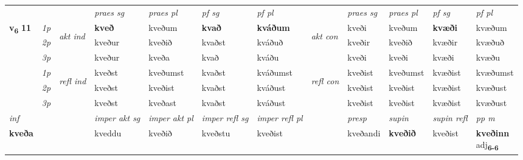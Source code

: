 \begin{longtable}[l]{X>{\footnotesize\itshape}llXXXXlXXXX}
 & &   & \textit{praes sg}  & \textit{praes pl}    & \textit{ pf sg} & \textit{pf pl} & & \textit{praes sg}  & \textit{praes pl}    & \textit{pf sg} & \textit{pf pl }  \\ \cmidrule{4-7} \cmidrule{9-12}
 \multirow{2}{*}{{{\textbf{v{\textsubscript{6}}} \Large{\textbf{11}}}}}  & 1p & \multirow{3}{*}{\begin{turn}{90}\textit{akt ind}\end{turn}} & \textbf{kveð} & kveðum & \textbf{kvað} & \textbf{kváðum} & \multirow{3}{*}{\begin{turn}{90}\textit{akt con}\end{turn}} &kveði & kveðum & \textbf{kvæði} & kvæðum\\*
 & 2p &  &  kveður  & kveðið & kvaðst & kváðuð & & kveðir & kveðið & kvæðir & kvæðuð \\*
 & 3p &  & kveður & kveða & kvað & kváðu & & kveði & kveði& kvæði & kvæðu \\*
\cmidrule{4-7} \cmidrule{9-12}
 & 1p & \multirow{3}{*}{\begin{turn}{90}\textit{refl ind}\end{turn}}  & kveðst & kveðumst & kvaðst & kváðumst & \multirow{3}{*}{\begin{turn}{90}\textit{refl con}\end{turn}}  &kveðist & kveðumst & kvæðist & kvæðumst \\*
 & 2p &  & kveðst & kveðist & kvaðst & kváðust & &kveðist & kveðist & kvæðist & kvæðust \\*
 & 3p  & & kveðst & kveðast & kvaðst & kváðust & & kveðist & kveðist& kvæðist & kvæðust \\*
\cmidrule{4-7} \cmidrule{9-12}

   {\textit{inf}} & &  & \textit{imper akt sg} & \textit{imper akt pl} & \textit{imper refl sg} & \textit{imper refl pl} && \textit{presp} & \textit{supin} & \textit{supin refl} & \textit{pp m} \\*
  {\textbf{kveða}} & && kveddu  & kveðið & kveðstu & kveðist && kveðandi &  \textbf{kveðið} & kveðist & \specialcell{\textbf{kveðinn} \\ adj\textbf{\textsubscript{6-6}}} \\*

\midrule


\end{longtable}
